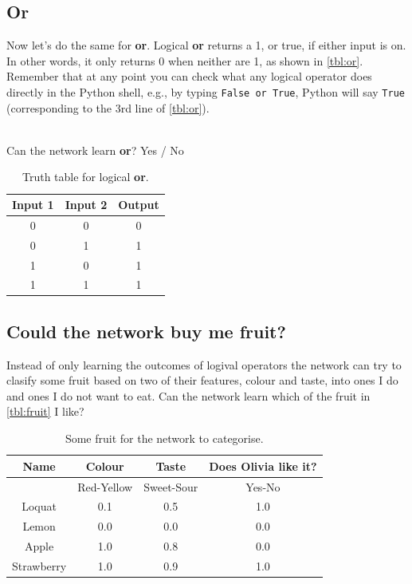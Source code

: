 \documentclass[a4paper,10pt]{article}
\begin{document}
\subsection{Or}

Now let's do the same for \textbf{or}. Logical \textbf{or} returns a 1, or true, if either input is on. In other words, it only returns 0 when neither are 1, as shown in \autoref{tbl:or}. Remember that at any point you can check what any logical operator does directly in the Python shell, e.g., by typing \texttt{False or True}, Python will say \texttt{True} (corresponding to the 3rd line of \autoref{tbl:or}).

\ \\ Can the network learn \textbf{or}?    Yes / No                                             

\begin{table}[ht]
 \centering
 \begin{tabular}[t]{ccc}
Input 1 & Input 2 & Output\\ \hline
0 & 0 & 0\\
0 & 1 & 1 \\
1 & 0 & 1 \\
1 & 1 & 1 \\

\end{tabular} \caption{Truth table for logical \textbf{or}.}
 \label{tbl:or}
\end{table}

\subsection{Could the network buy me fruit?}
 Instead of only learning the outcomes of logival operators the network can try to clasify some fruit based on two of their features, colour and taste, into ones I do and ones I do not want to eat. Can the network learn which of the fruit in \autoref{tbl:fruit} I like?
 



\begin{table}[ht]
 \centering
 \begin{tabular}[t]{cccc}
Name & Colour &  Taste & Does Olivia like it? \\ \hline
& Red-Yellow & Sweet-Sour & Yes-No \\ \hline
Loquat & 0.1 & 0.5 & 1.0 \\
Lemon & 0.0 &  0.0 & 0.0 \\
Apple & 1.0 &  0.8 & 0.0 \\
Strawberry & 1.0 &  0.9 & 1.0 \\
   
\end{tabular} \caption{Some fruit for the network to categorise.}
 \label{tbl:fruit}
\end{table}
\end{document}
